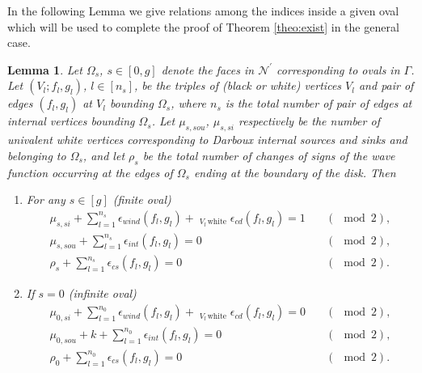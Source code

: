 \documentclass[11pt]{amsart}
\theoremstyle{plain}
\numberwithin{equation}{section}
\newtheorem{lemma}[theorem]{Lemma}
\begin{document}
In the following Lemma we give relations among the indices inside a given oval which will be used to complete the proof of Theorem \ref{theo:exist} in the general case.

\begin{lemma}\label{lemma:count_face}
Let $\Omega_s$, $s\in [0,g]$ denote the faces in ${\mathcal N}^{\prime}$ corresponding to ovals in $\Gamma$. Let $(V_l; f_l,g_l)$, $l\in [n_s]$, be the triples of (black or white) vertices $V_l$ and pair of edges $(f_l, g_l)$ at $V_l$ bounding $\Omega_s$, where $n_s$ is the total number of pair of edges at internal vertices bounding $\Omega_s$.
Let $\mu_{s, sou}$, $\mu_{s, si}$ respectively be the number of univalent white vertices corresponding to Darboux internal sources and sinks and belonging to $\Omega_s$, and let $\rho_{s}$ be the total number of changes of signs of the wave function occurring at the edges of $\Omega_s$ ending at the boundary of the disk.
Then
\begin{enumerate}
\item For any $s\in [g]$ (finite oval)
\begin{equation}\label{eq:eps_face_s}
\begin{array}{ll}
\mu_{s,si} + \displaystyle \sum_{l=1}^{n_s} \epsilon_{wind} (f_l,g_l) + \mathop{\sum_{l=1}^{n_s}}_{V_l \, \mbox{white}} \epsilon_{cd} (f_l,g_l) =1 &\quad
(\!\!\!\!\!\!\mod 2),\\
\displaystyle\mu_{s,sou} + \sum_{l=1}^{n_s} \epsilon_{int} (f_l,g_l) = 0 &\quad
(\!\!\!\!\!\!\mod 2),\\
\displaystyle\rho_{s}+\sum_{l=1}^{n_s} \epsilon_{cs} (f_l,g_l)  =  0  &\quad
(\!\!\!\!\!\!\mod 2).
\end{array}
\end{equation}
\item If $s=0$ (infinite oval)
\begin{equation}\label{eq:eps_face_0}
\begin{array}{ll}
\mu_{0,si} + \displaystyle \sum_{l=1}^{n_0} \epsilon_{wind} (f_l,g_l) + \mathop{\sum_{l=1}^{n_0}}_{V_l \, \mbox{white}} \epsilon_{cd} (f_l,g_l) =0 &\quad
(\!\!\!\!\!\!\mod 2),\\
\mu_{0,sou} + k + \sum_{l=1}^{n_0} \epsilon_{int} (f_l,g_l) = 0 &\quad
(\!\!\!\!\!\!\mod 2),\\
\rho_0+\sum_{l=1}^{n_0} \epsilon_{cs} (f_l,g_l)  =  0  &\quad
(\!\!\!\!\!\!\mod 2).
\end{array}
\end{equation}
\end{enumerate}
\end{lemma}
\end{document}
